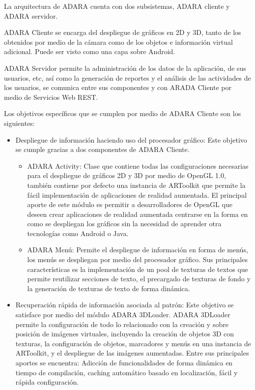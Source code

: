 \documentclass[12pt,a4paper,spanish,openany]{book}
\begin{document}
La arquitectura de ADARA cuenta con dos subsistemas, ADARA cliente y ADARA
servidor. 

ADARA Cliente se encarga del despliegue de gráficos en 2D y 3D, tanto
de los obtenidos por medio de la cámara como de los objetos e información
virtual adicional. Puede ser visto como una capa sobre Android.

ADARA Servidor permite la administración de los datos de la aplicación, de sus
usuarios, etc, así como la generación de reportes y el análisis de las
actividades de los usuarios, se comunica entre sus componentes y con ARADA Cliente por medio de Servicios Web REST.

Los objetivos específicos que se cumplen por medio de ADARA Cliente son los
siguientes:

\begin{itemize}
  \item Despliegue de información haciendo uso del procesador gráfico: Este
  objetivo se cumple gracias a dos componentes de ADARA Cliente.
    \begin{itemize}
    \item ADARA Activity: Clase que contiene todas las configuraciones
    necesarias para el despliegue de gráficos 2D y 3D por medio de OpenGL 1.0,
    también contiene por defecto una instancia de ARToolkit que permite la fácil
    implementación de aplicaciones de realidad aumentada. El principal aporte de
    este módulo es permitir a desarrolladores de OpenGL que deseen crear aplicaciones de
    realidad aumentada centrarse en la forma en como se despliegan los gráficos
    sin la necesidad de aprender otra tecnologías como Android o Java.
    \item ADARA Menú: Permite el despliegue de información en forma de menús,
    los menús se despliegan por medio del procesador gráfico. Sus principales
    características es la implementación de un pool de texturas de textos que
    permite reutilizar secciones de texto, el precargado de texturas de fondo y
    la generación de texturas de texto de forma dinámica. 
    \end{itemize}
  \item Recuperación rápida de información asociada al patrón: Este objetivo se
  satisface por medio del módulo ADARA 3DLoader. ADARA 3DLoader permite la
  configuración de todo lo relacionado con la creación y sobre posición de
  imágenes virtuales, incluyendo la creación de objetos 3D con texturas, la
  configuración de objetos, marcadores y menús en una instancia de ARToolkit, y
  el despliegue de las imágenes aumentadas. Entre sus principales aportes se
  encuentra: Adicción de funcionalidades de forma dinámica en tiempo de
  compilación, caching automático basado en localización, fácil y rápida
  configuración.  


\end{itemize}
\end{document}
